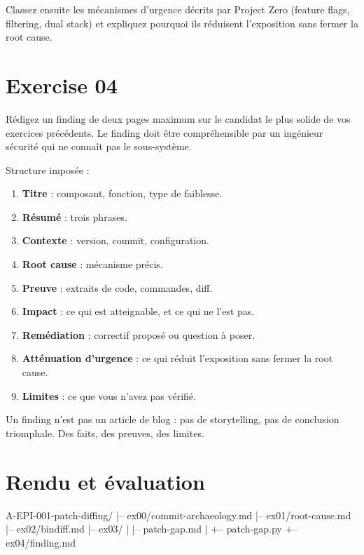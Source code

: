 \documentclass{training}
\begin{document}
Classez ensuite les mécanismes d'urgence décrits par Project Zero
(feature flags, filtering, dual stack) et expliquez pourquoi ils réduisent
l'exposition sans fermer la root cause.

\chapter{Exercise 04}
\makeheaderfiles

Rédigez un finding de deux pages maximum sur le candidat le plus solide de
vos exercices précédents. Le finding doit être compréhensible par un
ingénieur sécurité qui ne connaît pas le sous-système.

Structure imposée :

\begin{enumerate}
  \item \textbf{Titre} : composant, fonction, type de faiblesse.
  \item \textbf{Résumé} : trois phrases.
  \item \textbf{Contexte} : version, commit, configuration.
  \item \textbf{Root cause} : mécanisme précis.
  \item \textbf{Preuve} : extraits de code, commandes, diff.
  \item \textbf{Impact} : ce qui est atteignable, et ce qui ne l'est pas.
  \item \textbf{Remédiation} : correctif proposé ou question à poser.
  \item \textbf{Atténuation d'urgence} : ce qui réduit l'exposition sans
        fermer la root cause.
  \item \textbf{Limites} : ce que vous n'avez pas vérifié.
\end{enumerate}

Un finding n'est pas un article de blog : pas de storytelling, pas de
conclusion triomphale. Des faits, des preuves, des limites.

\chapter{Rendu et évaluation}

\begin{console}
A-EPI-001-patch-diffing/
|-- ex00/commit-archaeology.md
|-- ex01/root-cause.md
|-- ex02/bindiff.md
|-- ex03/
|   |-- patch-gap.md
|   +-- patch-gap.py
+-- ex04/finding.md
\end{console}
\end{document}
